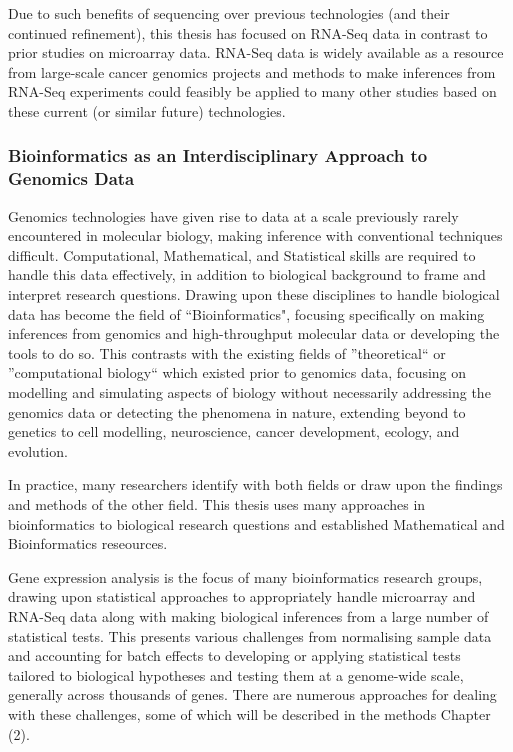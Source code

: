 Due to such benefits of sequencing over previous technologies (and their continued refinement), this thesis has focused on RNA-Seq data in contrast to prior studies on microarray data. RNA-Seq data is widely available as a resource from large-scale cancer genomics projects and methods to make inferences from RNA-Seq experiments could feasibly be applied to many other studies based on these current (or similar future) technologies.


\subsubsection{Bioinformatics as an Interdisciplinary Approach to Genomics Data}
Genomics technologies have given rise to data at a scale previously rarely encountered in molecular biology, making inference with conventional techniques difficult. Computational, Mathematical, and Statistical skills are required to handle this data effectively, in addition to biological background to frame and interpret research questions. Drawing upon these disciplines to handle biological data has become the field of ``Bioinformatics", focusing specifically on making inferences from genomics and high-throughput molecular data or developing the tools to do so. This contrasts with the existing fields of ''theoretical`` or ''computational biology`` which existed prior to genomics data, focusing on modelling and simulating aspects of biology without necessarily addressing the genomics data or detecting the phenomena in nature, extending beyond to genetics to cell modelling, neuroscience, cancer development, ecology, and evolution.

In practice, many researchers identify with both fields or draw upon the findings and methods of the other field. This thesis uses many approaches in bioinformatics to biological research questions and established Mathematical and Bioinformatics reseources.

Gene expression analysis is the focus of many bioinformatics research groups, drawing upon statistical approaches to appropriately handle microarray and RNA-Seq data along with making biological inferences from a large number of statistical tests. This presents various challenges from normalising sample data and accounting for batch effects to developing or applying statistical tests tailored to biological hypotheses and testing them at a genome-wide scale, generally across thousands of genes. There are numerous approaches for dealing with these challenges, some of which will be described in the methods Chapter (2).

